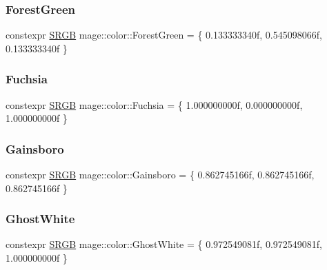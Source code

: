 \hypertarget{namespacemage_1_1color_a2d7e67954c6156e194165db58e58bc97}{}\label{namespacemage_1_1color_a2d7e67954c6156e194165db58e58bc97} 
\subsubsection{\texorpdfstring{Forest\+Green}{ForestGreen}}
{\footnotesize\ttfamily constexpr \hyperlink{structmage_1_1_s_r_g_b}{S\+R\+GB} mage\+::color\+::\+Forest\+Green = \{ 0.\+133333340f, 0.\+545098066f, 0.\+133333340f \}}

\hypertarget{namespacemage_1_1color_ace094140b3f356c536df67b441c9d98d}{}\label{namespacemage_1_1color_ace094140b3f356c536df67b441c9d98d} 
\subsubsection{\texorpdfstring{Fuchsia}{Fuchsia}}
{\footnotesize\ttfamily constexpr \hyperlink{structmage_1_1_s_r_g_b}{S\+R\+GB} mage\+::color\+::\+Fuchsia = \{ 1.\+000000000f, 0.\+000000000f, 1.\+000000000f \}}

\hypertarget{namespacemage_1_1color_a583df8c3b60258fd677dc01eed2d947f}{}\label{namespacemage_1_1color_a583df8c3b60258fd677dc01eed2d947f} 
\subsubsection{\texorpdfstring{Gainsboro}{Gainsboro}}
{\footnotesize\ttfamily constexpr \hyperlink{structmage_1_1_s_r_g_b}{S\+R\+GB} mage\+::color\+::\+Gainsboro = \{ 0.\+862745166f, 0.\+862745166f, 0.\+862745166f \}}

\hypertarget{namespacemage_1_1color_a97d27d6604ead54a2d60ca9b4f042783}{}\label{namespacemage_1_1color_a97d27d6604ead54a2d60ca9b4f042783} 
\subsubsection{\texorpdfstring{Ghost\+White}{GhostWhite}}
{\footnotesize\ttfamily constexpr \hyperlink{structmage_1_1_s_r_g_b}{S\+R\+GB} mage\+::color\+::\+Ghost\+White = \{ 0.\+972549081f, 0.\+972549081f, 1.\+000000000f \}}

